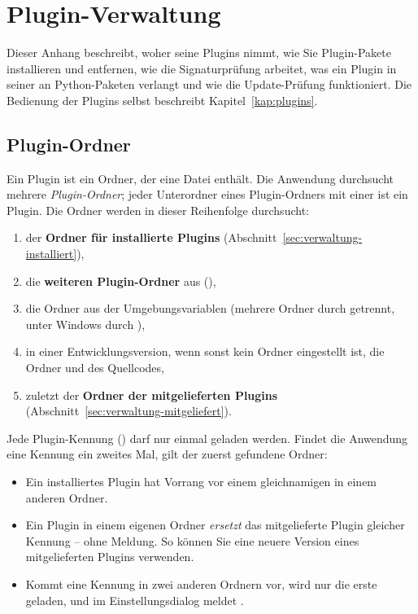 \chapter{Plugin-Verwaltung}\label{kap:plugin-verwaltung}

Dieser Anhang beschreibt, woher \produkt{} seine Plugins nimmt, wie Sie Plugin-Pakete
installieren und entfernen, wie die Signaturprüfung arbeitet, was ein Plugin in seiner
 an Python-Paketen verlangt und wie die Update-Prüfung funktioniert. Die
Bedienung der Plugins selbst beschreibt Kapitel~\ref{kap:plugins}.

\section{Plugin-Ordner}\label{sec:verwaltung-ordner}

Ein Plugin ist ein Ordner, der eine Datei  enthält. Die Anwendung durchsucht
mehrere \emph{Plugin-Ordner}; jeder Unterordner eines Plugin-Ordners mit einer
 ist ein Plugin. Die Ordner werden in dieser Reihenfolge durchsucht:

\begin{enumerate}
  \item der \textbf{Ordner für installierte Plugins} (Abschnitt~\ref{sec:verwaltung-installiert}),
  \item die \textbf{weiteren Plugin-Ordner} aus 
        (),
  \item die Ordner aus der Umgebungsvariablen  (mehrere Ordner durch
        \code{:} getrennt, unter Windows durch \code{;}),
  \item in einer Entwicklungsversion, wenn sonst kein Ordner eingestellt ist, die Ordner
         und  des Quellcodes,
  \item zuletzt der \textbf{Ordner der mitgelieferten Plugins}
        (Abschnitt~\ref{sec:verwaltung-mitgeliefert}).
\end{enumerate}

Jede Plugin-Kennung () darf nur einmal geladen werden. Findet die Anwendung eine
Kennung ein zweites Mal, gilt der zuerst gefundene Ordner:

\begin{itemize}
  \item Ein installiertes Plugin hat Vorrang vor einem gleichnamigen in einem anderen Ordner.
  \item Ein Plugin in einem eigenen Ordner \emph{ersetzt} das mitgelieferte Plugin gleicher
        Kennung – ohne Meldung. So können Sie eine neuere Version eines mitgelieferten Plugins
        verwenden.
  \item Kommt eine Kennung in zwei anderen Ordnern vor, wird nur die erste geladen, und
         im Einstellungsdialog meldet .
\end{itemize}

